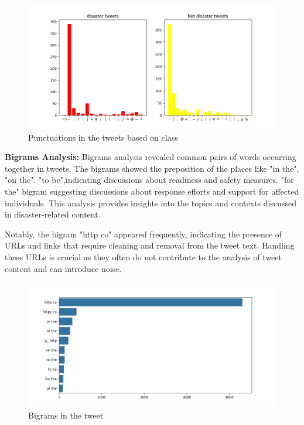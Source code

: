 \begin{figure}[ht]
    \centering
    \includegraphics[scale=0.7]{figures/punctuationfor1.png}
    \caption{Punctuations in the tweets based on class}
\end{figure}

\textbf{Bigrams Analysis:}
Bigrams analysis revealed common pairs of words occurring together in tweets. The bigrams showed the preposition of the places like "in the", "on the".
"to be",indicating discussions about readiness and safety measures.
"for the" bigram suggesting discussions about response efforts and support for affected individuals. This analysis provides insights into the topics and contexts discussed in disaster-related content.

Notably, the bigram "http co" appeared frequently, indicating the presence of URLs and links that require cleaning and removal from the tweet text. Handling these URLs is crucial as they often do not contribute to the analysis of tweet content and can introduce noise.
\begin{figure}[ht]
    \centering
    \includegraphics[scale=0.7]{figures/bigram.png}
    \caption{Bigrams in the tweet}
\end{figure}

